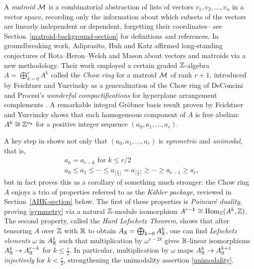 A {\it matroid} $\mathcal{M}$ is a combinatorial abstraction of lists of vectors $v_1,v_2,\ldots,v_n$ in a vector space, recording only the information about which subsets of the vectors
are linearly independent or dependent, forgetting their coordinates-- see
Section~\ref{matroid-background-section} for definitions and references.
In groundbreaking work, Adiprasito, Huh and Katz \cite{AHK} affirmed long-standing conjectures of Rota--Heron--Welsh and Mason about vectors and matroids via a new methodology.  Their work employed
a certain graded $\mathbb{Z}$-algebra $A=\bigoplus_{k=0}^r A^k$
called the \emph{Chow ring} for a matroid $\mathcal{M}$ of rank $r+1$, introduced by Feichtner and Yuzvinsky \cite{FY} as a generalization of the Chow ring of DeConcini and Procesi's \emph{wonderful compactifications} for hyperplane arrangement complements \cite{DCP}. 
A remarkable integral Gr\"obner basis result proven by Feichtner and Yuzvinsky \cite[Thm. 2]{FY} shows that each homogeneous component of $A$ is free abelian:  $A^k \cong \mathbb{Z}^{a_k}$ for a positive integer sequence $(a_0,a_1,\ldots,a_r)$.

A key step in \cite{AHK} shows not only that 
$(a_0,a_1,\ldots,a_r)$ is
{\it symmetric} and {\it unimodal}, that is,
\begin{align}
\label{symmetry}
&a_k = a_{r-k}\text{ for } k \leq r/2\\
\label{unimodality} 
&a_0 \leq a_1 \leq \cdots \leq a_{\lfloor \frac{r}{2} \rfloor} =
a_{\lceil \frac{r}{2} \rceil} \geq \cdots \geq a_{r-1} \geq a_r,
\end{align}
but in fact proves this as a corollary of something much stronger: the Chow ring $A$ enjoys a trio of properties referred to as the {\it K\"ahler package}, reviewed in Section~\ref{AHK-section} below.  The first of these properties is
{\it Poincar\'e duality}, proving \eqref{symmetry} via a natural
$\mathbb{Z}$-module isomorphism $A^{r-k} \cong \mathrm{Hom}_{\mathbb{Z}}(A^k,\mathbb{Z})$.  The second property, called the {\it Hard Lefschetz Theorem}, shows that after tensoring $A$ over $\mathbb{Z}$ with $\mathbb{R}$ to obtain $A_{\mathbb{R}}=\bigoplus_{k=0}A^k_{\mathbb{R}}$, one can find {\it Lefschetz elements} $\omega$ in $A^1_{\mathbb{R}}$ such that multiplication by $\omega^{r-2k}$ gives $\mathbb{R}$-linear isomorphisms $A^k_{\mathbb{R}} \rightarrow A^{r-k}_{\mathbb{R}}$ for $k \leq \frac{r}{2}$.  In particular, multiplication by $\omega$ maps $A^k_{\mathbb{R}} \rightarrow A_{\mathbb{R}}^{k+1}$ {\it injectively} for $k < \frac{r}{2}$, strengthening the unimodality assertion \eqref{unimodality}. 


